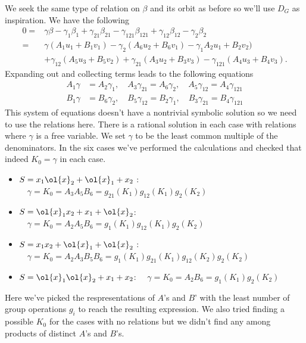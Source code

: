 We seek the same type of relation on $\beta$ and its orbit as before so we'll use $D_G$ as inspiration. We have the following
\begin{align}
0=&\gamma\beta-\gamma_{1}\beta_{1}+\gamma_{21}\beta_{21}-\gamma_{121}\beta_{121}+\gamma_{12}\beta_{12}-\gamma_{2}\beta_{2}\\
	=&\gamma (A_1 u_1 + B_1 v_1) - \gamma_{2} (A_6 u_2 + B_6 v_1) - \gamma_{1} A_2 u_1 + B_2 v_2) \\&+  \gamma_{12} (A_5 u_3 + B_5 v_2) + \gamma_{21}(A_3 u_2 + B_3 v_3) - \gamma_{121} (A_4 u_3 + B_4 v_3).
\end{align}
Expanding out and collecting terms leads to the following equations
\begin{align}
	 A_1 \gamma&= A_2 \gamma_{1},   \quad A_3 \gamma_{21} = A_6 \gamma_{2}, \quad A_5 \gamma_{12} = A_4 \gamma_{121}\\
	 B_1 \gamma &= B_6\gamma_{2},  \quad  B_5 \gamma_{12}= B_2 \gamma_{1},  \quad B_3 \gamma_{21} = B_4 \gamma_{121}
\end{align}
This system of equations doesn't have a nontrivial symbolic solution so we need to use the relations here. There is a rational solution in each case with relations where $\gamma$ is a free variable. We set $\gamma$ to be the least common multiple of the denominators. In the six cases we've performed the calculations and checked that indeed $K_0 = \gamma$ in each case.
\begin{itemize}
\item $S = x_1\ol{x}_2+\ol{x}_1+x_2$ : $\quad\gamma = K_0 =  A_3 A_5 B_6 = g_{21}(K_1) g_{12}(K_1) g_{2}(K_2)$
\item $S = \ol{x}_1x_2 + x_1 + \ol{x}_2$:   $\quad\gamma = K_0 =  A_2 A_5 B_6 = g_{1}(K_1) g_{12}(K_1) g_{2}(K_2)$
\item $S = x_1 x_2+\ol{x}_1+\ol{x}_2$ :  $\quad\gamma = K_0 =  A_2 A_3 B_5 B_6 = g_{1}(K_1) g_{21}(K_1) g_{12}(K_2) g_{2}(K_2)$
\item $S = \ol{x}_1\ol{x}_2 + x_1 + x_2$:  $\quad\gamma = K_0 =  A_2 B_6 = g_{1}(K_1) g_{2}(K_2)$
\end{itemize}
Here we've picked the respresentations of $A$'s and $B$' with the least number of group operations $g_i$ to reach the resulting expression. We also tried finding a possible $K_0$ for the cases with no relations but we didn't find any among products of distinct $A$'s and $B$'s.
